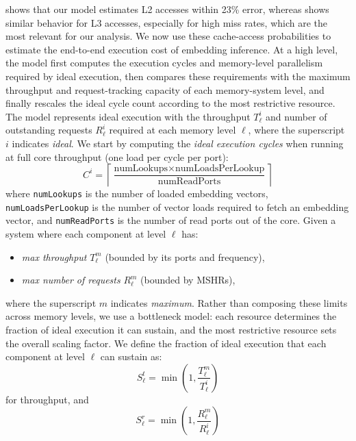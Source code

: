  shows that our model estimates L2 accesses within 23\% error, whereas  shows similar behavior for L3 accesses, especially for high miss rates, which are the most relevant for our analysis. We now use these cache-access probabilities to estimate the end-to-end execution cost of embedding inference. At a high level, the model first computes the execution cycles and memory-level parallelism required by ideal execution, then compares these requirements with the maximum throughput and request-tracking capacity of each memory-system level, and finally rescales the ideal cycle count according to the most restrictive resource. The model represents ideal execution with the throughput $T^i_\ell$ and number of outstanding requests $R^i_\ell$ required at each memory level $\ell$, where the superscript $i$ indicates \emph{ideal}. We start by computing the \emph{ideal execution cycles} when running at full core throughput (one load per cycle per port):
\begin{equation}
C^i = \left\lceil \frac{\text{numLookups} \times \text{numLoadsPerLookup}}{\text{numReadPorts}} \right\rceil
\end{equation}
where \texttt{numLookups} is the number of loaded embedding vectors, \texttt{numLoadsPerLookup} is the number of vector loads required to fetch an embedding vector, and \texttt{numReadPorts} is the number of read ports out of the core. Given a system where each component at level $\ell$ has:
\begin{itemize}
    \item \emph{max throughput} $T^m_\ell$ (bounded by its ports and frequency),
    \item \emph{max number of requests} $R^m_\ell$ (bounded by MSHRs),
\end{itemize}
where the superscript $m$ indicates \emph{maximum}. Rather than composing these limits across memory levels, we use a bottleneck model: each resource determines the fraction of ideal execution it can sustain, and the most restrictive resource sets the overall scaling factor. We define the fraction of ideal execution that each component at level $\ell$ can sustain as:
\begin{equation}
S^{t}_\ell = \min \left( 1, \frac{T^m_\ell}{T^i_\ell} \right)
\end{equation}
for throughput, and
\begin{equation}
S^{r}_\ell = \min \left( 1, \frac{R^m_\ell}{R^i_\ell} \right)
\end{equation}
